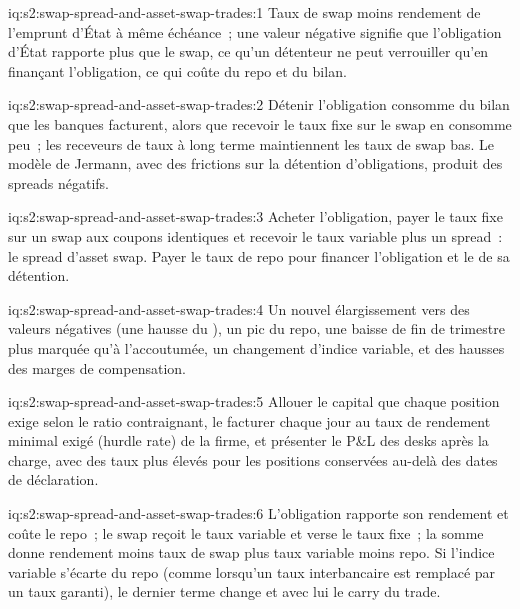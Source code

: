 \begin{solution}{iq:s2:swap-spread-and-asset-swap-trades:1}
Taux de swap moins rendement de l'emprunt d'État à même échéance~; une valeur négative signifie que l'obligation d'État rapporte plus que le swap, ce qu'un détenteur ne peut verrouiller
qu'en finançant l'obligation, ce qui coûte du repo et du bilan.
\end{solution}

\begin{solution}{iq:s2:swap-spread-and-asset-swap-trades:2}
Détenir l'obligation consomme du bilan que les banques facturent, alors que recevoir le taux fixe sur le swap en consomme peu~; les receveurs de taux à long terme maintiennent les taux de swap bas.
Le modèle de Jermann, avec des frictions sur la détention d'obligations, produit des spreads négatifs.
\end{solution}

\begin{solution}{iq:s2:swap-spread-and-asset-swap-trades:3}
Acheter l'obligation, payer le taux fixe sur un swap aux coupons identiques et recevoir le taux variable plus un spread~: le spread d'asset swap. Payer le taux de repo pour financer
l'obligation et le  de sa détention.
\end{solution}

\begin{solution}{iq:s2:swap-spread-and-asset-swap-trades:4}
Un nouvel élargissement vers des valeurs négatives (une hausse du ), un pic du repo, une baisse de fin de trimestre plus marquée qu'à l'accoutumée, un changement d'indice variable, et
des hausses des marges de compensation.
\end{solution}

\begin{solution}{iq:s2:swap-spread-and-asset-swap-trades:5}
Allouer le capital que chaque position exige selon le ratio contraignant, le facturer chaque jour au taux de rendement minimal exigé (hurdle rate) de la firme, et présenter le P\&L des desks après la
charge, avec des taux plus élevés pour les positions conservées au-delà des dates de déclaration.
\end{solution}

\begin{solution}{iq:s2:swap-spread-and-asset-swap-trades:6}
L'obligation rapporte son rendement et coûte le repo~; le swap reçoit le taux variable et verse le taux fixe~; la somme donne rendement moins taux de swap plus taux variable moins
repo. Si l'indice variable s'écarte du repo (comme lorsqu'un taux interbancaire est remplacé par un taux garanti), le dernier terme change et avec lui le
carry du trade.
\end{solution}
